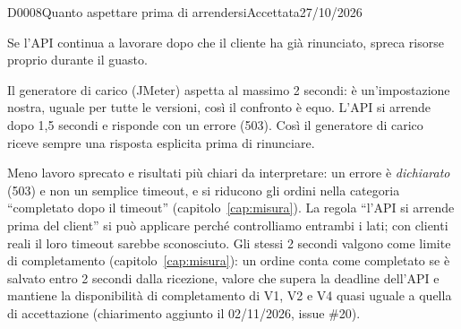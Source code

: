 \begin{decisione}{D0008}{Quanto aspettare prima di arrendersi}{Accettata}{27/10/2026}

\contesto
Se l'API continua a lavorare dopo che il cliente ha già rinunciato, spreca risorse proprio durante il guasto.

\scelta
Il generatore di carico (JMeter) aspetta al massimo 2 secondi: è un'impostazione nostra, uguale per tutte le versioni, così il confronto è equo. L'API si arrende dopo 1,5 secondi e risponde con un errore (503). Così il generatore di carico riceve sempre una risposta esplicita prima di rinunciare.

\conseguenze
Meno lavoro sprecato e risultati più chiari da interpretare: un errore è \emph{dichiarato} (503) e non un semplice timeout, e si riducono gli ordini nella categoria ``completato dopo il timeout'' (capitolo~\ref{cap:misura}). La regola ``l'API si arrende prima del client'' si può applicare perché controlliamo entrambi i lati; con clienti reali il loro timeout sarebbe sconosciuto. Gli stessi 2 secondi valgono come limite di completamento (capitolo~\ref{cap:misura}): un ordine conta come completato se è salvato entro 2 secondi dalla ricezione, valore che supera la deadline dell'API e mantiene la disponibilità di completamento di V1, V2 e V4 quasi uguale a quella di accettazione (chiarimento aggiunto il 02/11/2026, issue \#20).

\end{decisione}
